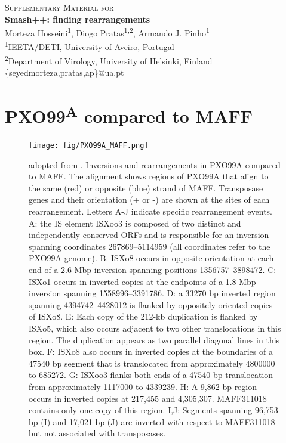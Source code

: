 \documentclass[a4paper,9pt]{extarticle}
\begin{document}
\begin{titlepage}
  \centering
  \vspace*{10mm}
  \Large\textsc{Supplementary Material for} \\[5mm]
  \huge\textbf{Smash++: finding rearrangements} \\[12mm]
  \Large Morteza Hosseini\textsuperscript{1}, Diogo Pratas\textsuperscript{1,2}, Armando J. Pinho\textsuperscript{1} \\[6mm]
  \normalsize \textsuperscript{1}IEETA/DETI, University of Aveiro, Portugal \\[1mm]\textsuperscript{2}Department of Virology, University of Helsinki, Finland \\[4mm]
  {\ttfamily\{seyedmorteza,pratas,ap\}@ua.pt}
  
  \vspace{\fill}
  \thispagestyle{empty}
  \raggedright
  \normalsize\tableofcontents
\end{titlepage}


\clearpage
\section{PXO99\textsuperscript{A} compared to MAFF}
\begin{figure}[!h]
  \centering
  \texttt{[image: fig/PXO99A\_MAFF.png]}
  \caption{adopted from \cite{salzberg2008genome}.
    Inversions and rearrangements in PXO99A compared to MAFF. The alignment shows regions of PXO99A that align to the same (red) or opposite (blue) strand of MAFF. Transposase genes and their orientation (+ or -) are shown at the sites of each rearrangement. Letters A-J indicate specific rearrangement events. A: the IS element ISXoo3 is composed of two distinct and independently conserved ORFs and is responsible for an inversion spanning coordinates 267869–5114959 (all coordinates refer to the PXO99A genome). B: ISXo8 occurs in opposite orientation at each end of a 2.6 Mbp inversion spanning positions 1356757–3898472. C: ISXo1 occurs in inverted copies at the endpoints of a 1.8 Mbp inversion spanning 1558996–3391786. D: a 33270 bp inverted region spanning 4394742–4428012 is flanked by oppositely-oriented copies of ISXo8. E: Each copy of the 212-kb duplication is flanked by ISXo5, which also occurs adjacent to two other translocations in this region. The duplication appears as two parallel diagonal lines in this box. F: ISXo8 also occurs in inverted copies at the boundaries of a 47540 bp segment that is translocated from approximately 4800000 to 685272. G: ISXoo3 flanks both ends of a 47540 bp translocation from approximately 1117000 to 4339239. H: A 9,862 bp region occurs in inverted copies at 217,455 and 4,305,307. MAFF311018 contains only one copy of this region. I,J: Segments spanning 96,753 bp (I) and 17,021 bp (J) are inverted with respect to MAFF311018 but not associated with transposases.}
\end{figure}
\end{document}
